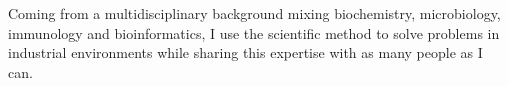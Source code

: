 

\begin{cvparagraph}

Coming from a multidisciplinary background mixing biochemistry, microbiology, immunology and bioinformatics, I use the scientific method to solve problems in industrial environments while sharing this expertise with as many people as I can. 
\end{cvparagraph}

